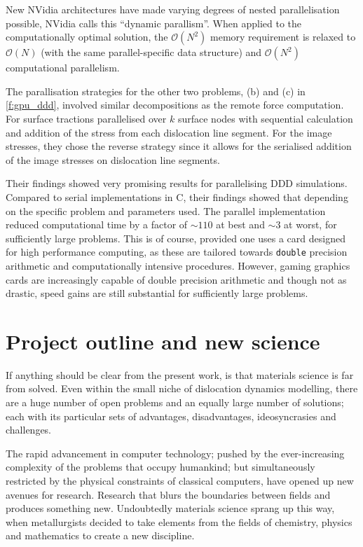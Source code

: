 New NVidia architectures have made varying degrees of nested parallelisation possible, NVidia calls this ``dynamic parallism''. When applied to the computationally optimal solution, the $ \mathcal{O}(N^{2}) $ memory requirement is relaxed to $ \mathcal{O}(N) $ (with the same parallel-specific data structure) and $ \mathcal{O}(N^{2}) $ computational parallelism.

The parallisation strategies for the other two problems, (b) and (c) in \cref{f:gpu_ddd}, involved similar decompositions as the remote force computation. For surface tractions \citet{gpu_ddd} parallelised over $ k $ surface nodes with sequential calculation and addition of the stress from each dislocation line segment. For the image stresses, they chose the reverse strategy since it allows for the serialised addition of the image stresses on dislocation line segments.

Their findings showed very promising results for parallelising DDD simulations. Compared to serial implementations in C, their findings showed that depending on the specific problem and parameters used. The parallel implementation reduced computational time by a factor of $ \sim 110 $ at best and $ \sim 3 $ at worst, for sufficiently large problems. This is of course, provided one uses a card designed for high performance computing, as these are tailored towards \texttt{double} precision arithmetic and computationally intensive procedures. However, gaming graphics cards are increasingly capable of double precision arithmetic and though not as drastic, speed gains are still substantial for sufficiently large problems.

\section{Project outline and new science}
\label{s:objectives}

If anything should be clear from the present work, is that materials science is far from solved. Even within the small niche of dislocation dynamics modelling, there are a huge number of open problems and an equally large number of solutions; each with its particular sets of advantages, disadvantages, ideosyncrasies and challenges.

The rapid advancement in computer technology; pushed by the ever-increasing complexity of the problems that occupy humankind; but simultaneously restricted by the physical constraints of classical computers, have opened up new avenues for research. Research that blurs the boundaries between fields and produces something new. Undoubtedly materials science sprang up this way, when metallurgists decided to take elements from the fields of chemistry, physics and mathematics to create a new discipline.

